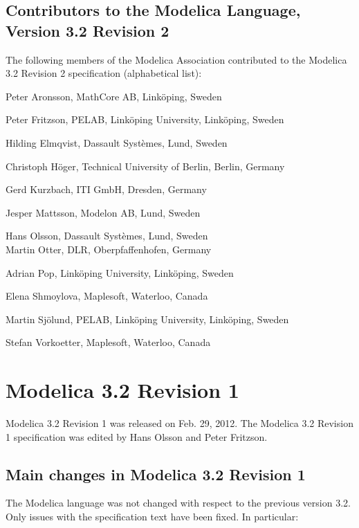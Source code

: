 \documentclass[10pt,a4paper]{report}
\def\doublelabel#1{\label{#1}\hypertarget{#1}{}}
\begin{document}
\subsection{Contributors to the Modelica Language, Version 3.2 Revision 2}\doublelabel{contributors-to-the-modelica-language-version-3-2-revision-2}

The following members of the Modelica Association contributed to the
Modelica 3.2 Revision 2 specification (alphabetical list):

Peter Aronsson, MathCore AB, Linköping, Sweden

Peter Fritzson, PELAB, Linköping University, Linköping, Sweden

Hilding Elmqvist, Dassault Systèmes, Lund, Sweden

Christoph Höger, Technical University of Berlin, Berlin, Germany

Gerd Kurzbach, ITI GmbH, Dresden, Germany

Jesper Mattsson, Modelon AB, Lund, Sweden

Hans Olsson, Dassault Systèmes, Lund, Sweden\\
Martin Otter, DLR, Oberpfaffenhofen, Germany

Adrian Pop, Linköping University, Linköping, Sweden

Elena Shmoylova, Maplesoft, Waterloo, Canada

Martin Sjölund, PELAB, Linköping University, Linköping, Sweden

Stefan Vorkoetter, Maplesoft, Waterloo, Canada

\section{Modelica 3.2 Revision 1}\doublelabel{modelica-3-2-revision-1}

Modelica 3.2 Revision 1 was released on Feb. 29, 2012. The Modelica 3.2
Revision 1 specification was edited by Hans Olsson and Peter Fritzson.

\subsection{Main changes in Modelica 3.2 Revision 1}\doublelabel{main-changes-in-modelica-3-2-revision-1}

The Modelica language was not changed with respect to the previous
version 3.2. Only issues with the specification text have been fixed. In
particular:
\end{document}
